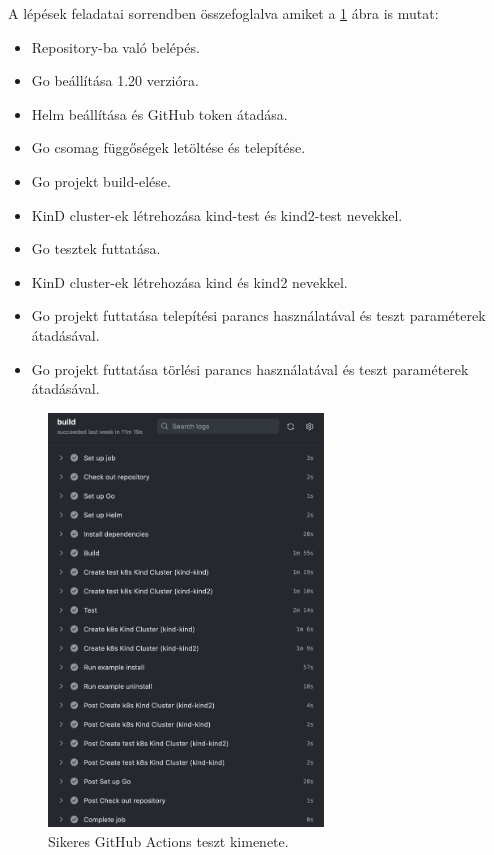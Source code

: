 A lépések feladatai sorrendben összefoglalva amiket a \ref{github-actions-run-log} ábra is mutat:
\begin{itemize}
  \item Repository-ba való belépés.
  \item Go beállítása 1.20 verzióra.
  \item Helm beállítása és GitHub token átadása.
  \item Go csomag függőségek letöltése és telepítése.
  \item Go projekt build-elése.
  \item KinD cluster-ek létrehozása kind-test és kind2-test nevekkel.
  \item Go tesztek futtatása.
  \item KinD cluster-ek létrehozása kind és kind2 nevekkel.
  \item Go projekt futtatása telepítési parancs használatával és teszt paraméterek átadásával.
  \item Go projekt futtatása törlési parancs használatával és teszt paraméterek átadásával.
\end{itemize} 

\begin{figure}[ht]
  \centering
       \includegraphics[width=0.65\textwidth]{figures/kli/actions-run-log.png}
        \caption{Sikeres GitHub Actions teszt kimenete.}
         \label{github-actions-run-log}
\end{figure}

